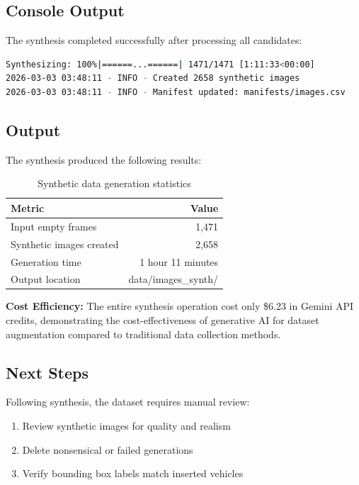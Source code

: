 \documentclass[12pt,a4paper]{article}
\begin{document}
\subsection{Console Output}

The synthesis completed successfully after processing all candidates:

\begin{lstlisting}[language=bash, basicstyle=\ttfamily\scriptsize]
Synthesizing: 100%|======...======| 1471/1471 [1:11:33<00:00]
2026-03-03 03:48:11 - INFO - Created 2658 synthetic images
2026-03-03 03:48:11 - INFO - Manifest updated: manifests/images.csv
\end{lstlisting}

\subsection{Output}

The synthesis produced the following results:

\begin{table}[H]
	\centering
	\begin{tabular}{lr}
		\toprule
		\textbf{Metric} & \textbf{Value} \\
		\midrule
		Input empty frames & 1,471 \\
		Synthetic images created & 2,658 \\
		Generation time & 1 hour 11 minutes \\
		Output location & data/images\_synth/ \\
		\bottomrule
	\end{tabular}
	\caption{Synthetic data generation statistics}
\end{table}

\noindent\textbf{Cost Efficiency:} The entire synthesis operation cost only \$6.23 in Gemini API credits, demonstrating the cost-effectiveness of generative AI for dataset augmentation compared to traditional data collection methods.


\subsection{Next Steps}

Following synthesis, the dataset requires manual review:

\begin{enumerate}
	\item Review synthetic images for quality and realism
	\item Delete nonsensical or failed generations
	\item Verify bounding box labels match inserted vehicles
\end{enumerate}
\end{document}

